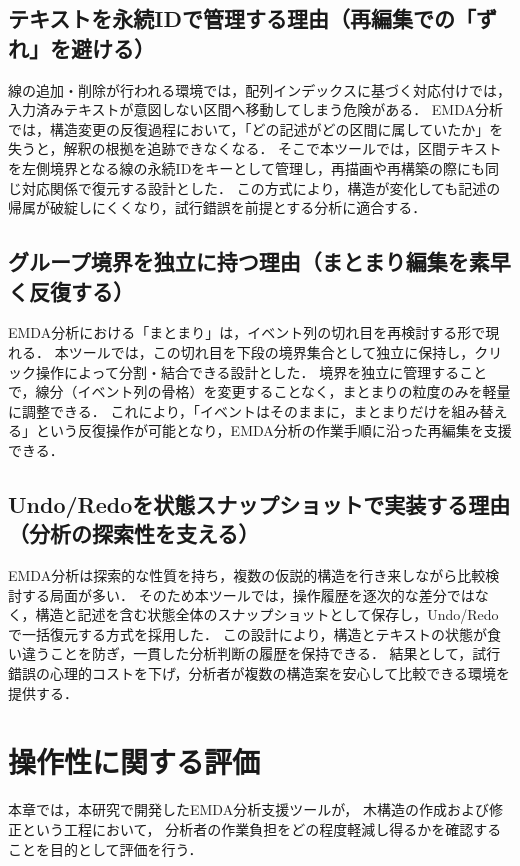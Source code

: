 \subsection{テキストを永続IDで管理する理由（再編集での「ずれ」を避ける）}

線の追加・削除が行われる環境では，配列インデックスに基づく対応付けでは，入力済みテキストが意図しない区間へ移動してしまう危険がある．
EMDA分析では，構造変更の反復過程において，「どの記述がどの区間に属していたか」を失うと，解釈の根拠を追跡できなくなる．
そこで本ツールでは，区間テキストを左側境界となる線の永続IDをキーとして管理し，再描画や再構築の際にも同じ対応関係で復元する設計とした．
この方式により，構造が変化しても記述の帰属が破綻しにくくなり，試行錯誤を前提とする分析に適合する．

\subsection{グループ境界を独立に持つ理由（まとまり編集を素早く反復する）}

EMDA分析における「まとまり」は，イベント列の切れ目を再検討する形で現れる．
本ツールでは，この切れ目を下段の境界集合として独立に保持し，クリック操作によって分割・結合できる設計とした．
境界を独立に管理することで，線分（イベント列の骨格）を変更することなく，まとまりの粒度のみを軽量に調整できる．
これにより，「イベントはそのままに，まとまりだけを組み替える」という反復操作が可能となり，EMDA分析の作業手順に沿った再編集を支援できる．

\subsection{Undo/Redoを状態スナップショットで実装する理由（分析の探索性を支える）}

EMDA分析は探索的な性質を持ち，複数の仮説的構造を行き来しながら比較検討する局面が多い．
そのため本ツールでは，操作履歴を逐次的な差分ではなく，構造と記述を含む状態全体のスナップショットとして保存し，Undo/Redoで一括復元する方式を採用した．
この設計により，構造とテキストの状態が食い違うことを防ぎ，一貫した分析判断の履歴を保持できる．
結果として，試行錯誤の心理的コストを下げ，分析者が複数の構造案を安心して比較できる環境を提供する．

\section{操作性に関する評価}

本章では，本研究で開発したEMDA分析支援ツールが，
木構造の作成および修正という工程において，
分析者の作業負担をどの程度軽減し得るかを確認することを目的として評価を行う．

